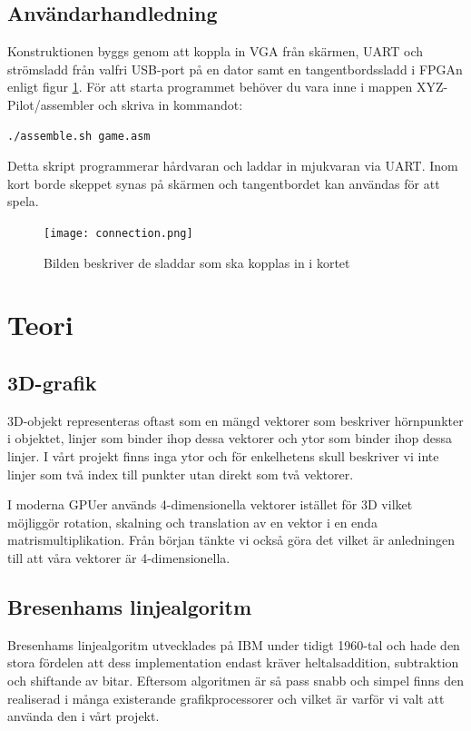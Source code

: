 \documentclass[a4paper]{article}
\begin{document}
	\subsection{Användarhandledning}
    Konstruktionen byggs genom att koppla in VGA från skärmen, UART och
    strömsladd från valfri USB-port på en dator samt en tangentbordssladd i
    FPGAn enligt figur \ref{fig:connection}. För att starta programmet behöver du vara inne i
    mappen XYZ-Pilot/assembler och skriva in kommandot:
    
    \begin{lstlisting}[language=bash]
    ./assemble.sh game.asm
    \end{lstlisting}
 
    Detta skript programmerar hårdvaran och laddar in mjukvaran via UART. Inom
    kort borde skeppet synas på skärmen och tangentbordet kan användas för att
    spela. 

    \begin{figure}[H]
        \centering
        \texttt{[image: connection.png]}
        \caption{Bilden beskriver  de sladdar som ska kopplas in i kortet}
        \label{fig:connection}
    \end{figure}

    


    \section{Teori}
    \subsection{3D-grafik}
    3D-objekt representeras oftast som en mängd vektorer som beskriver hörnpunkter i
    objektet, linjer som binder ihop dessa vektorer och ytor som binder ihop dessa
    linjer. I vårt projekt finns inga ytor och för enkelhetens skull beskriver vi
    inte linjer som två index till punkter utan direkt som två vektorer. 

    I moderna GPUer används 4-dimensionella  vektorer istället för 3D vilket
    möjliggör rotation, skalning och translation av en vektor i en enda
    matrismultiplikation. Från början tänkte vi också göra det vilket är anledningen
    till att våra  vektorer är 4-dimensionella. 

    
    \subsection{Bresenhams linjealgoritm}
    Bresenhams linjealgoritm utvecklades på IBM under tidigt 1960-tal och hade den
    stora fördelen att dess implementation endast kräver heltalsaddition,
    subtraktion och shiftande av bitar. Eftersom algoritmen är så pass snabb och
    simpel finns den realiserad i många existerande grafikprocessorer och vilket är
    varför vi valt att använda den i vårt projekt.  
\end{document}
